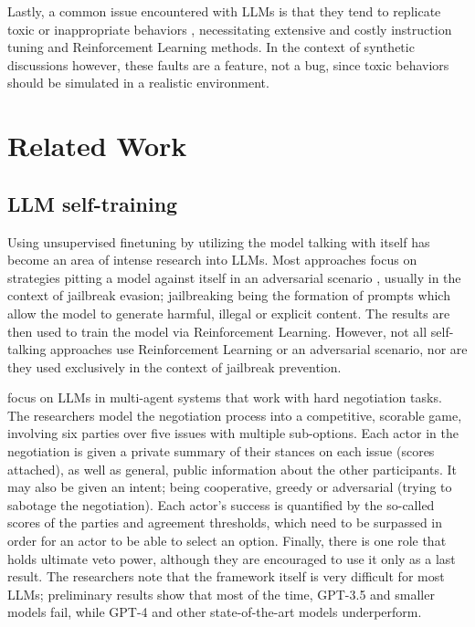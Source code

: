 Lastly, a common issue encountered with LLMs is that they tend to replicate toxic or inappropriate behaviors \cite{Birkun_Gautam_2023}, necessitating extensive and costly instruction tuning and Reinforcement Learning methods. In the context of synthetic discussions however, these faults are a feature, not a bug, since toxic behaviors should be simulated in a realistic environment.

\section{Related Work}
\label{sec:related:sec2}

\subsection{LLM self-training}
\label{sec:related:self-train}

Using unsupervised finetuning by utilizing the model talking with itself has become an area of intense research into LLMs. Most approaches focus on strategies pitting a model against itself in an adversarial scenario \cite{liu2024largelanguagemodelsagents, cheng2024selfplayingadversariallanguagegame, zheng2024optimalllmalignmentsusing}, usually in the context of jailbreak evasion; jailbreaking being the formation of prompts which allow the model to generate harmful, illegal or explicit content. The results are then used to train the model via Reinforcement Learning. However, not all self-talking approaches use Reinforcement Learning or an adversarial scenario, nor are they used exclusively in the context of jailbreak prevention.  

\cite{abdelnabi2024cooperationcompetitionmaliciousnessllmstakeholders} focus on LLMs in multi-agent systems that work with hard negotiation tasks. The researchers model the negotiation process into a competitive, scorable game, involving six parties over five issues with multiple sub-options. Each actor in the negotiation is given a private summary of their stances on each issue (scores attached), as well as general, public information about the other participants. It may also be given an intent; being cooperative, greedy or adversarial (trying to sabotage the negotiation). Each actor's success is quantified by the so-called scores of the parties and agreement thresholds, which need to be surpassed in order for an actor to be able to select an option. Finally, there is one role that holds ultimate veto power, although they are encouraged to use it only as a last result. The researchers note that the framework itself is very difficult for most LLMs; preliminary results show that most of the time, GPT-3.5 and smaller models fail, while GPT-4 and other state-of-the-art models underperform.

